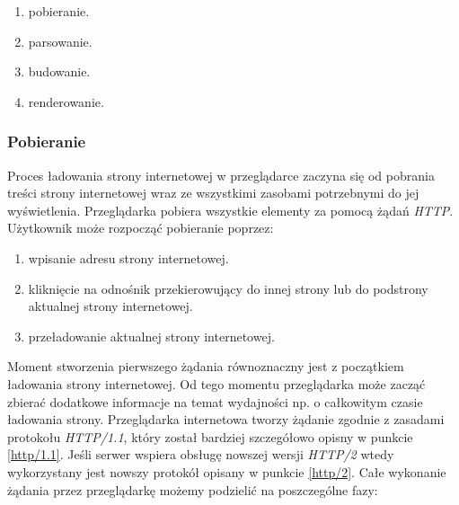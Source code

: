 \documentclass[polish, twoside, 12pt]{mwart}
\begin{document}
\begin{enumerate}
  \item pobieranie.
  \item parsowanie.
  \item budowanie.
  \item renderowanie.
\end{enumerate}

\subsubsection{Pobieranie}

Proces ładowania strony internetowej w przeglądarce zaczyna się od pobrania treści strony internetowej wraz ze wszystkimi zasobami potrzebnymi do jej wyświetlenia.
Przeglądarka pobiera wszystkie elementy za pomocą żądań \emph{HTTP}. Użytkownik może rozpocząć pobieranie poprzez:

\begin{enumerate}
  \item wpisanie adresu strony internetowej.
  \item kliknięcie na odnośnik przekierowujący do innej strony lub do podstrony aktualnej strony internetowej.
  \item przeładowanie aktualnej strony internetowej.
\end{enumerate}

Moment stworzenia pierwszego żądania równoznaczny jest z początkiem ładowania strony internetowej. Od tego momentu przeglądarka może zacząć zbierać dodatkowe informacje na temat wydajności np. o całkowitym czasie ładowania strony. Przeglądarka internetowa tworzy żądanie zgodnie z zasadami protokołu \emph{HTTP/1.1}, który został bardziej szczegółowo opisny w punkcie \ref{http/1.1}. Jeśli serwer wspiera obsługę nowszej wersji \emph{HTTP/2} wtedy wykorzystany jest nowszy protokół opisany w punkcie \ref{http/2}. Całe wykonanie żądania przez przeglądarkę możemy podzielić na poszczególne fazy:
\end{document}
